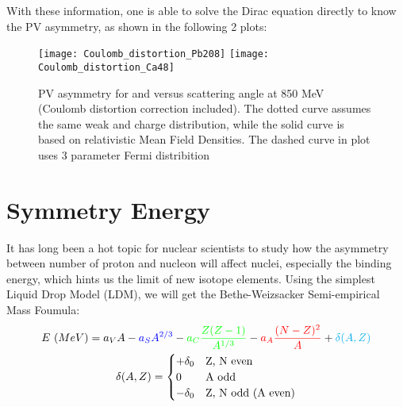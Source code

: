 With these information, one is able to solve the Dirac equation directly to know
the PV asymmetry, as shown in the following 2 plots:
\begin{figure}[h!]
    \texttt{[image: Coulomb\_distortion\_Pb208]}
    \texttt{[image: Coulomb\_distortion\_Ca48]}
    \caption{PV asymmetry for \Pb and \Ca versus scattering angle at 850 MeV 
    (Coulomb distortion correction included). 
    The dotted curve assumes the same weak and charge distribution, 
    while the solid curve is based on relativistic Mean Field Densities. The
    dashed curve in \Pb plot uses 3 parameter Fermi distribition \cite{PhysRevC.57.3430}}
\end{figure}


\section{Symmetry Energy} 
It has long been a hot topic for nuclear scientists to study how the asymmetry 
between number of proton and nucleon will affect nuclei, especially the binding
energy, which hints us the limit of new isotope elements. Using the simplest 
Liquid Drop Model (LDM), we will get the Bethe-Weizsacker Semi-empirical Mass Foumula:
\begin{equation}
    \label{eq:mass-foumula}
    \begin{gathered}
	E\ (MeV) = \textcolor{black}{a_V A} 
	    - \textcolor{blue}{a_S A^{2/3}} 
	    - \textcolor{green}{a_C\frac{Z(Z-1)}{A^{1/3}}} 
	    - \textcolor{red}{a_A\frac{(N-Z)^2}{A}} 
	    + \textcolor{cyan}{\delta(A, Z)} \\
	\delta(A, Z) = 
	    \begin{cases}
		+\delta_0	& \text{Z, N even} \\
		0		& \text{A odd}	\\
		-\delta_0	& \text{Z, N odd (A even)} \\
	    \end{cases}
    \end{gathered}
\end{equation}


